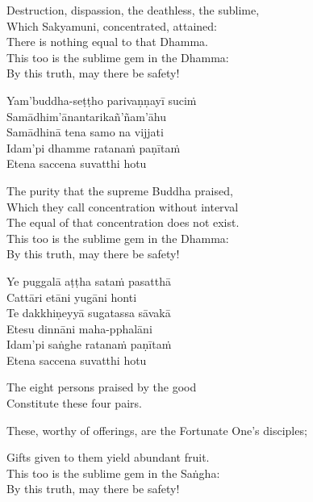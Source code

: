\begin{english-verses}
  Destruction, dispassion, the deathless, the sublime,\\
  Which Sakyamuni, concentrated, attained:\\
  There is nothing equal to that Dhamma.\\
  This too is the sublime gem in the Dhamma:\\
  By this truth, may there be safety!
\end{english-verses}

\ifninebythirteen\clearpage\fi

\begin{pali-hang-continued}
  Yam'buddha-seṭṭho parivaṇṇayī suciṁ\\
  Samādhim'ānantarikañ'ñam'āhu\\
  Samādhinā tena samo na vijjati\\
  Idam'pi dhamme ratanaṁ paṇītaṁ\\
  Etena saccena suvatthi hotu
\end{pali-hang-continued}

\begin{english-verses}
  The purity that the supreme Buddha praised,\\
  Which they call concentration without interval\\
  The equal of that concentration does not exist.\\
  This too is the sublime gem in the Dhamma:\\
  By this truth, may there be safety!
\end{english-verses}

\ifbfive\clearpage\fi
\ifafive\clearpage\fi

\begin{pali-hang-continued}
  Ye puggalā aṭṭha sataṁ pasatthā\\
  Cattāri etāni yugāni honti\\
  Te dakkhiṇeyyā sugatassa sāvakā\\
  Etesu dinnāni maha-pphalāni\\
  Idam'pi saṅghe ratanaṁ paṇītaṁ\\
  Etena saccena suvatthi hotu
\end{pali-hang-continued}

\begin{english-verses}
  The eight persons praised by the good\\
  Constitute these four pairs.\\
  \begin{english-hang-together-verses}
  These, worthy of offerings, are the Fortunate One's disciples;\\
  \end{english-hang-together-verses}
  Gifts given to them yield abundant fruit.\\
  This too is the sublime gem in the Saṅgha:\\
  By this truth, may there be safety!
\end{english-verses}

